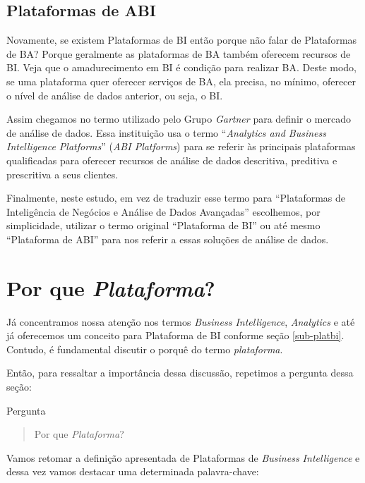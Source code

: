 \subsection{Plataformas de ABI}

    Novamente, se existem Plataformas de BI então porque não falar de Plataformas de BA? Porque geralmente as plataformas de BA também oferecem recursos de BI. Veja que o amadurecimento em BI é condição para realizar BA. Deste modo, se uma plataforma quer oferecer serviços de BA, ela precisa, no mínimo, oferecer o nível de análise de dados anterior, ou seja, o BI. 
    
    Assim chegamos no termo utilizado pelo Grupo \emph{Gartner} para definir o mercado de análise de dados. Essa instituição usa o termo ``\emph{Analytics and Business Intelligence Platforms}'' (\emph{ABI Platforms}) para se referir às principais plataformas qualificadas para oferecer recursos de análise de dados descritiva, preditiva e prescritiva a seus clientes.
    
    Finalmente, neste estudo, em vez de traduzir esse termo para ``Plataformas de Inteligência de Negócios e Análise de Dados Avançadas'' escolhemos, por simplicidade, utilizar o termo original ``Plataforma de BI'' ou até mesmo ``Plataforma de ABI'' para nos referir a essas soluções de análise de dados.
    

\section{Por que \emph{Plataforma}?}
\label{sec-porqueplat}

    Já concentramos nossa atenção nos termos \emph{Business Intelligence}, \emph{Analytics} e até já oferecemos um conceito para Plataforma de BI conforme seção \ref{sub-platbi}. Contudo, é fundamental discutir o porquê do termo  \emph{plataforma}.

    Então, para ressaltar a importância dessa discussão, repetimos a pergunta dessa seção:
    
    \begin{env-destaque}{Pergunta}
    \begin{quote}
        Por que \emph{Plataforma}?
    \end{quote}
    \end{env-destaque}

    Vamos retomar a definição apresentada de  Plataformas de \emph{Business Intelligence} e dessa vez vamos destacar uma determinada palavra-chave:
    
